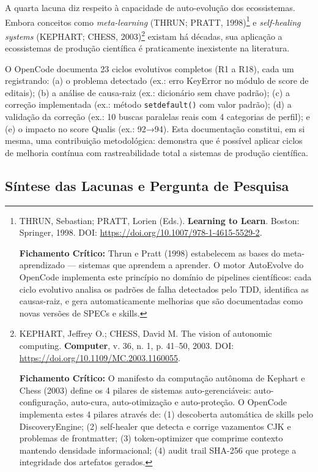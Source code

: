 A quarta lacuna diz respeito à capacidade de auto-evolução dos ecossistemas. Embora conceitos como \textit{meta-learning} (THRUN; PRATT, 1998)\footnote{
  THRUN, Sebastian; PRATT, Lorien (Eds.). \textbf{Learning to Learn}. Boston: Springer, 1998. DOI: \url{https://doi.org/10.1007/978-1-4615-5529-2}.

  \textbf{Fichamento Crítico:} Thrun e Pratt (1998) estabelecem as bases do meta-aprendizado --- sistemas que aprendem a aprender. O motor AutoEvolve do OpenCode implementa este princípio no domínio de pipelines científicos: cada ciclo evolutivo analisa os padrões de falha detectados pelo TDD, identifica as causas-raiz, e gera automaticamente melhorias que são documentadas como novas versões de SPECs e skills.
} e \textit{self-healing systems} (KEPHART; CHESS, 2003)\footnote{
  KEPHART, Jeffrey O.; CHESS, David M. The vision of autonomic computing. \textbf{Computer}, v. 36, n. 1, p. 41--50, 2003. DOI: \url{https://doi.org/10.1109/MC.2003.1160055}.

  \textbf{Fichamento Crítico:} O manifesto da computação autônoma de Kephart e Chess (2003) define os 4 pilares de sistemas auto-gerenciáveis: auto-configuração, auto-cura, auto-otimização e auto-proteção. O OpenCode implementa estes 4 pilares através de: (1) descoberta automática de skills pelo DiscoveryEngine; (2) self-healer que detecta e corrige vazamentos CJK e problemas de frontmatter; (3) token-optimizer que comprime contexto mantendo densidade informacional; (4) audit trail SHA-256 que protege a integridade dos artefatos gerados.
} existam há décadas, sua aplicação a ecossistemas de produção científica é praticamente inexistente na literatura.

O OpenCode documenta 23 ciclos evolutivos completos (R1 a R18), cada um registrando: (a) o problema detectado (ex.: erro KeyError no módulo de score de editais); (b) a análise de causa-raiz (ex.: dicionário sem chave padrão); (c) a correção implementada (ex.: método \texttt{setdefault()} com valor padrão); (d) a validação da correção (ex.: 10 buscas paralelas reais com 4 categorias de perfil); e (e) o impacto no score Qualis (ex.: 92→94). Esta documentação constitui, em si mesma, uma contribuição metodológica: demonstra que é possível aplicar ciclos de melhoria contínua com rastreabilidade total a sistemas de produção científica.

\subsection{Síntese das Lacunas e Pergunta de Pesquisa}

